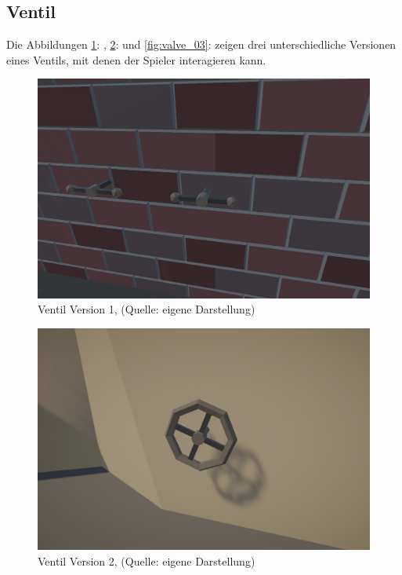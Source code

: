 \subsection{Ventil}
Die Abbildungen \ref{fig:valve_01}: , \ref{fig:valve_02}:  und \ref{fig:valve_03}:  zeigen drei unterschiedliche Versionen eines Ventils, mit denen der Spieler interagieren kann. 

\begin{figure}[ht]
\centering
\includegraphics[width=0.8\linewidth]{content/pictures/Vault.jpg}
\caption{Ventil Version 1, (Quelle: eigene Darstellung)}
\label{fig:valve_01}
\end{figure}

\begin{figure}[ht]
\centering
\includegraphics[width=0.8\linewidth]{content/pictures/Vault_02.jpg}
\caption{Ventil Version 2, (Quelle: eigene Darstellung)}
\label{fig:valve_02}
\end{figure}

